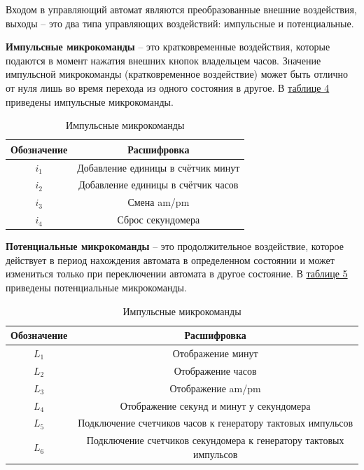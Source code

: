 \documentclass[11pt,a4paper,final]{article} %
\begin{document}
\par Входом в управляющий автомат являются преобразованные внешние воздействия, выходы – это два типа
управляющих воздействий: импульсные и потенциальные. 

\par {\bf Импульсные микрокоманды} -- это кратковременные воздействия, которые подаются в момент нажатия внешних кнопок владельцем часов. Значение импульсной микрокоманды (кратковременное воздействие) может быть отлично от нуля лишь во время перехода из одного состояния в другое. В \hyperref[tab:impulse]{таблице 4} приведены импульсные микрокоманды.

\begin{table}[H]
	\captionsetup{skip=0pt}
\begin{center}
	\begin{tabular}{|c|c|}
		\hline
		Обозначение & Расшифровка \\ 
		\hline
		$ i_1 $ & Добавление единицы в счётчик минут \\
		$ i_2 $ & Добавление единицы в счётчик часов \\
		$ i_3 $ & Смена am/pm \\
		$ i_4 $ & Сброс секундомера \\
		\hline
	\end{tabular}
\end{center}
\caption{Импульсные микрокоманды}
\label{tab:impulse}
\end{table}

\par {\bf Потенциальные микрокоманды} -- это продолжительное воздействие, которое действует в период нахождения автомата в определенном состоянии и может измениться только при переключении автомата в другое состояние. В \hyperref[tab:impulse]{таблице 5} приведены потенциальные микрокоманды.

\begin{table}[H]
	\captionsetup{skip=0pt}
	\begin{center}
		\begin{tabular}{|c|c|}
			\hline
			Обозначение & Расшифровка \\ 
			\hline
			$ L_1 $ & Отображение минут \\
			$ L_2 $ & Отображение часов \\
			$ L_3 $ & Отображение am/pm \\
			$ L_4 $ & Отображение секунд и минут у секундомера \\
			$ L_5 $ & Подключение счетчиков часов к генератору тактовых импульсов \\
			$ L_6 $ & Подключение счетчиков секундомера к генератору тактовых импульсов \\
			\hline
		\end{tabular}
	\end{center}
	\caption{Импульсные микрокоманды}
	\label{tab:impulse}
\end{table}
\end{document}
